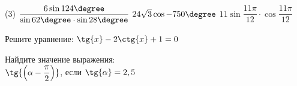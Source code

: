 \begin{consultation}
\begin{listofex}
			\begin{tasks}(3)
				\task \( \dfrac{6\sin{124\degree}}{\sin{62\degree}\cdot \sin{28\degree}} \)
				\task \( 24\sqrt{3}\cos{-750\degree} \)
				\task \( 11\sin{\dfrac{11\pi}{12}}\cdot \cos  {\dfrac{11\pi}{12}} \)
			\end{tasks}
			\item Решите уравнение:
				\( \tg{x} - 2 \ctg{x}+1=0 \)
			\item Найдите значение выражения: \\
				\( \tg{\left( \alpha-\dfrac{\pi}{2}\right)} \), если \( \tg{\alpha}=2,5 \)
			
		\end{listofex}
\end{consultation}

